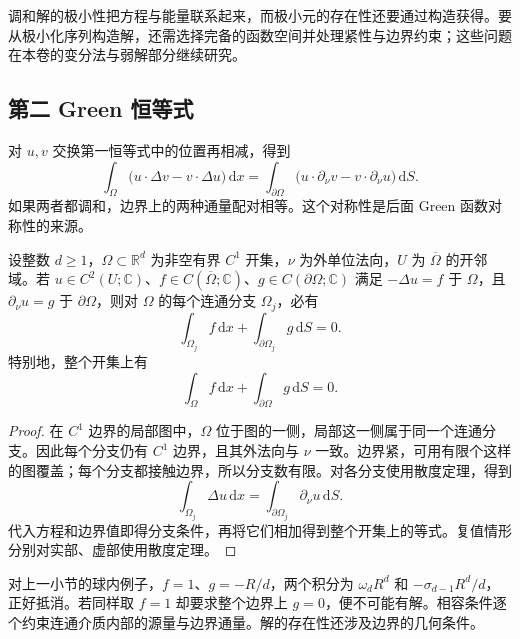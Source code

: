 调和解的极小性把方程与能量联系起来，而极小元的存在性还要通过构造获得。要从极小化序列构造解，还需选择完备的函数空间并处理紧性与边界约束；这些问题在本卷的变分法与弱解部分继续研究。

\subsection{第二 Green 恒等式}
\label{b2:subsec:130202}

对 \(u,v\) 交换第一恒等式中的位置再相减，得到
\begin{equation}\label{b2:eq:13-green-second}
 \int_\Omega\bigl(u\cdot\Delta v-v\cdot\Delta u\bigr)\,\mathrm{d}x
 =\int_{\partial\Omega}
       \bigl(u\cdot\partial_\nu v-v\cdot\partial_\nu u\bigr)\,\mathrm{d}S.
\end{equation}
如果两者都调和，边界上的两种通量配对相等。这个对称性是后面 Green 函数对称性的来源。

\begin{proposition}\label{b2:prop:13-neumann-compatibility}
设整数 \(d\geq1\)，\(\Omega\subset\mathbb R^d\) 为非空有界 \(C^1\) 开集，\(\nu\) 为外单位法向，\(U\) 为 \(\overline\Omega\) 的开邻域。若 \(u\in C^2(U;\mathbb C)\)、\(f\in C(\overline\Omega;\mathbb C)\)、\(g\in C(\partial\Omega;\mathbb C)\) 满足 \(-\Delta u=f\) 于 \(\Omega\)，且 \(\partial_\nu u=g\) 于 \(\partial\Omega\)，则对 \(\Omega\) 的每个连通分支 \(\Omega_j\)，必有
\[
 \int_{\Omega_j}f\,\mathrm{d}x+\int_{\partial\Omega_j}g\,\mathrm{d}S=0.
\]
特别地，整个开集上有
\[
 \int_\Omega f\,\mathrm{d}x+\int_{\partial\Omega}g\,\mathrm{d}S=0.
\]
\end{proposition}
\begin{proof}
在 \(C^1\) 边界的局部图中，\(\Omega\) 位于图的一侧，局部这一侧属于同一个连通分支。因此每个分支仍有 \(C^1\) 边界，且其外法向与 \(\nu\) 一致。边界紧，可用有限个这样的图覆盖；每个分支都接触边界，所以分支数有限。对各分支使用散度定理，得到
\[
 \int_{\Omega_j}\Delta u\,\mathrm{d}x
 =\int_{\partial\Omega_j}\partial_\nu u\,\mathrm{d}S.
\]
代入方程和边界值即得分支条件，再将它们相加得到整个开集上的等式。复值情形分别对实部、虚部使用散度定理。
\end{proof}

对上一小节的球内例子，\(f=1\)、\(g=-R/d\)，两个积分为 \(\omega_dR^d\) 和 \(-\sigma_{d-1}R^d/d\)，正好抵消。若同样取 \(f=1\) 却要求整个边界上 \(g=0\)，便不可能有解。相容条件逐个约束连通介质内部的源量与边界通量。解的存在性还涉及边界的几何条件。

\ProseParagraphBreak

